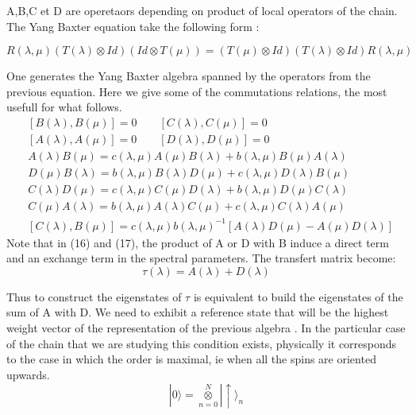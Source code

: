 \documentclass[12pt]{article}
\begin{document}
A,B,C et D are operetaors depending on product of local operators of the chain.
The Yang Baxter equation take the following form : 

\begin{equation}
R(\lambda,\mu)(T(\lambda)\otimes Id)(Id\otimes T(\mu))=(T(\mu)\otimes Id)(T(\lambda)\otimes Id) R(\lambda,\mu)
\end{equation}



One generates the Yang Baxter algebra spanned by the operators from the previous equation. Here we give some of the commutations relations, the most usefull for what follows. 
\begin{align}
&[B(\lambda),B(\mu)]=0\qquad [C(\lambda),C(\mu)]=0\\
&[A(\lambda),A(\mu)]=0\qquad [D(\lambda),D(\mu)]=0\\
&A(\lambda)B(\mu)=c(\lambda,\mu)A(\mu)B(\lambda)+b(\lambda,\mu)B(\mu)A(\lambda)\\
&D(\mu)B(\lambda)=b(\lambda,\mu)B(\lambda)D(\mu)+c(\lambda,\mu)D(\lambda)B(\mu)\\
&C(\lambda)D(\mu)=c(\lambda,\mu)C(\mu)D(\lambda)+b(\lambda,\mu)D(\mu)C(\lambda)\\
&C(\mu)A(\lambda)=b(\lambda,\mu)A(\lambda)C(\mu)+c(\lambda,\mu)C(\lambda)A(\mu)\\
&[C(\lambda),B(\mu)]=c(\lambda,\mu)b(\lambda,\mu)^{-1}[A(\lambda)D(\mu)-A(\mu)D(\lambda)]
\end{align}
Note that in  (16) and (17), the product of A or D with B induce a direct term and an exchange term in the spectral parameters.
The transfert matrix become:
\begin{equation}
\tau(\lambda)=A(\lambda)+D(\lambda)
\end{equation}

Thus to construct the eigenstates of $ \tau $ is equivalent to build the eigenstates of the sum of A with D. We need to exhibit a reference state that will be the highest weight vector of the representation of the previous algebra . In the particular case of the chain that we are studying  this condition exists, physically it corresponds to the case in which the order is maximal, ie when all the spins are oriented upwards.
\begin{equation}
|0\rangle=\overset{N}{\underset{n=0}{\otimes}}|\uparrow\rangle_{n}
\end{equation}
\end{document}
